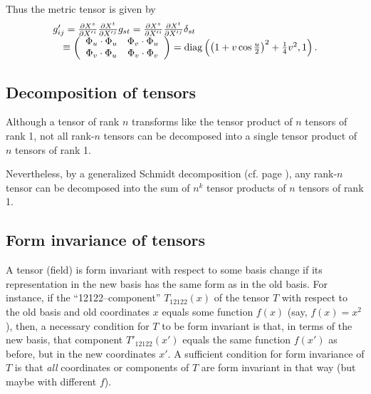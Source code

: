 Thus the metric tensor is given by
\begin{equation}
\begin{array}{l}
g'_{ij}
= {\partial {X}^s\over \partial {X'}^i}{\partial {X}^t\over \partial {X'}^j}g_{st}
= {\partial {X}^s\over \partial {X'}^i}{\partial {X}^t\over \partial {X'}^j}\delta_{st}\\
\quad \equiv
\left(
\begin{array}{cc}
\Phi _{u}\cdot \Phi _{u} & \Phi _{v}\cdot \Phi _{u} \\
\Phi _{v}\cdot \Phi _{u} & \Phi _{v}\cdot \Phi _{v}
\end{array}
\right) ={\rm diag}\left(
\left(1+v\cos \frac{u}{2}\right)^{2}+\frac{1}{4}v^{2} , 1\right).
\end{array}
\end{equation}

\subsection{Decomposition of tensors}

Although a tensor of rank $n$ transforms like the tensor product of $n$ tensors of rank 1,
not all rank-$n$ tensors can be decomposed into a single
tensor product of $n$ tensors of rank 1.

Nevertheless,
by a generalized Schmidt decomposition (cf. page \pageref{2011-m-Schmidtdecomposition}),
any rank-$n$ tensor  can be decomposed into
the sum of $n^k$
tensor products of $n$ tensors of rank 1.

\subsection{Form invariance of tensors}

A tensor (field) is
form invariant  with respect to some basis change
if its representation in the new basis has the same form as in the old basis.
For instance, if the ``12122--component'' $T_{12122} (x)$ of the tensor $T$
with respect to the old basis and old coordinates $x$   equals some function $f(x)$ (say, $f(x)=x^2$),
then, a necessary condition for $T$ to be form invariant is that, in terms of the new basis,
that component  $T'_{12122} (x')$  equals the same function $f(x')$ as before, but in the new coordinates $x'$.
A sufficient condition for form invariance of $T$ is that {\em all}
coordinates or components of $T$ are form invariant in that way (but maybe with different $f$).


